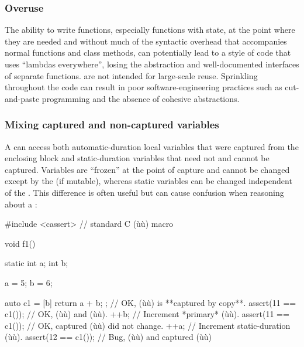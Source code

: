 \subsubsection[Overuse]{Overuse}\label{overuse}

The ability to write functions, especially functions with state, at the
point where they are needed and without much of the syntactic overhead
that accompanies normal functions and class methods, can potentially
lead to a style of code that uses ``lambdas everywhere'', losing the
abstraction and well-documented interfaces of separate functions.
 are not intended for large-scale reuse.
Sprinkling  throughout the code can result in
poor software-engineering practices such as cut-and-paste programming
and the absence of cohesive abstractions.

\subsubsection[Mixing captured and non-captured variables]{Mixing captured and non-captured variables}\label{mixing-captured-and-non-captured-variables}

A  can access both automatic-duration local
variables that were captured from the enclosing block and
static-duration variables that need not and cannot be captured.
Variables  are ``frozen'' at the point of
capture and cannot be changed except by the  (if
mutable), whereas static variables can be changed independent of the
. This difference is often useful but can
cause confusion when reasoning about a :

\begin{emcppshiddenlisting}[emcppsbatch=e14]
#include <cassert>  // standard C (ù{}ù) macro
\end{emcppshiddenlisting}
\begin{emcppslisting}[emcppsbatch=e14]

void f1()
{
    static int a;
    int        b;

    a = 5;
    b = 6;

    auto c1 = [b]{ return a + b; };  // OK, (ù{}ù) is **captured by copy**.
    assert(11 == c1());              // OK, (ù{}ù) and (ù{}ù).
    ++b;                             // Increment *primary* (ù{}ù).
    assert(11 == c1());              // OK, captured (ù{}ù) did not change.
    ++a;                             // Increment static-duration (ù{}ù).
    assert(12 == c1());              // Bug, (ù{}ù) and captured (ù{}ù)
}
\end{emcppslisting}


